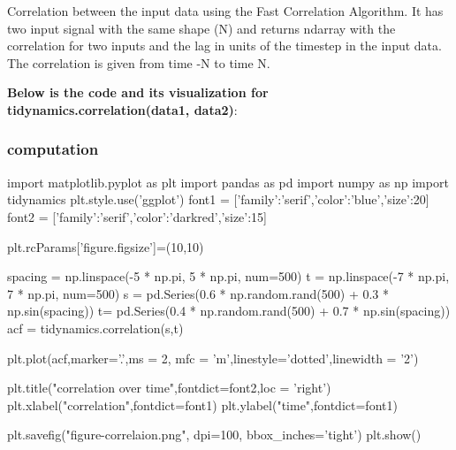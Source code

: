 \documentclass[12pt, a4paper, twoside]{report}
\begin{document}
Correlation between the input data using the Fast Correlation Algorithm. It has two  input signal with the same shape (N) and returns ndarray with the correlation for two inputs and the lag in units of the timestep in the input data. The correlation is given from time -N to time N.

 \textbf{Below is the code and its visualization for tidynamics.correlation(data1, data2)}:
\subsubsection{computation}

import matplotlib.pyplot as plt\newline
import pandas as pd\newline
import numpy as np\newline
import tidynamics\newline
plt.style.use('ggplot')\newline
font1 = ['family':'serif','color':'blue','size':20]\newline
font2 = ['family':'serif','color':'darkred','size':15]\newline

plt.rcParams['figure.figsize']=(10,10)\newline


spacing = np.linspace(-5 * np.pi, 5 * np.pi, num=500)\newline
t = np.linspace(-7 * np.pi, 7 * np.pi, num=500)\newline
s = pd.Series(0.6 * np.random.rand(500) + 0.3 * np.sin(spacing))\newline
t= pd.Series(0.4 * np.random.rand(500) + 0.7 * np.sin(spacing))\newline
acf = tidynamics.correlation(s,t)\newline



plt.plot(acf,marker='.',ms = 2, mfc = 'm',linestyle='dotted',linewidth = '2')\newline

plt.title("correlation over time",fontdict=font2,loc = 'right')\newline
plt.xlabel("correlation",fontdict=font1)\newline
plt.ylabel("time",fontdict=font1)\newline

plt.savefig("figure-correlaion.png", dpi=100, bbox_inches='tight')\newline
plt.show()\newline
\end{document}
